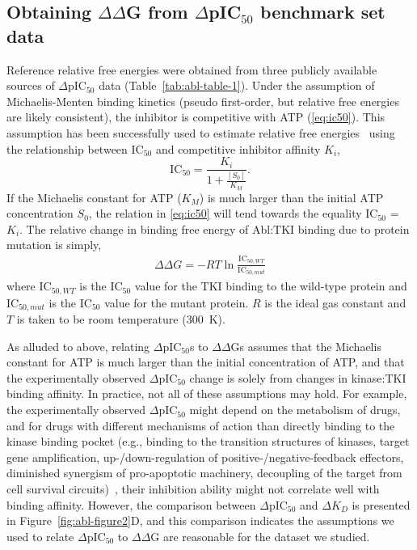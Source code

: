 \documentclass[phd,tocprelim]{cornell}
\renewcommand{\EQ}[1]{\autoref{eq:#1}}
\begin{document}
\subsection{Obtaining $\Delta\Delta$G from $\Delta$pIC$_{50}$ benchmark set data}
Reference relative free energies were obtained from three publicly available sources of $\Delta$pIC$_{50}$ data (Table~\ref{tab:abl-table-1}).
Under the assumption of Michaelis-Menten binding kinetics (pseudo first-order, but relative free energies are likely consistent), the inhibitor is competitive with ATP (\EQ{ic50}). 
This assumption has been successfully used to estimate relative free energies~\citep{Price:Bioorg.Med.Chem.Lett.:2000,Luccarelli:J.Chem.TheoryComput.:2010,Michel:J.Med.Chem.:2006,mondal2016} using the relationship between IC$_{50}$ and competitive inhibitor affinity $K_{i}$,
\begin{equation}
\label{eq:ic50}
\mathrm{IC}_{50} = \frac{ K_{i} }{ 1 + \frac{[S_{0}]}{K_{M}} } .
\end{equation}
If the Michaelis constant for ATP ($K_{M}$) is much larger than the initial ATP concentration $S_{0}$, the relation in \EQ{ic50} will tend towards the equality IC$_{50}$ = $K_{i}$. The relative change in binding free energy of Abl:TKI binding due to protein mutation is simply,
\begin{eqnarray}
\Delta\Delta G = - RT \ln \frac{\mathrm{IC}_{50,WT}}{\mathrm{IC}_{50,mut}} \label{eq:ddg}
\end{eqnarray}
where IC$_{50,WT}$ is the IC$_{50}$ value for the TKI binding to the wild-type protein and IC$_{50,mut}$ is the IC$_{50}$ value for the mutant protein. 
$R$ is the ideal gas constant and $T$ is taken to be room temperature (300~K).

As alluded to above, relating $\Delta$pIC$_{50}$s to $\Delta\Delta$Gs assumes that the Michaelis constant for ATP is much larger than the initial concentration of ATP, and that the experimentally observed $\Delta$pIC$_{50}$ change is solely from changes in kinase:TKI binding affinity. In practice, not all of these assumptions may hold. 
For example, the experimentally observed $\Delta$pIC$_{50}$ might depend on the metabolism of drugs, and for drugs with different mechanisms of action than directly binding to the kinase binding pocket (e.g., binding to the transition structures of kinases, target gene amplification, up-/down-regulation of positive-/negative-feedback effectors, diminished synergism of pro-apoptotic machinery, decoupling of the target from cell survival circuits)~\citep{BarouchBentov:2011dx,McDermott:2007kq},
their inhibition ability might not correlate well with binding affinity. 
However, the comparison between $\Delta$pIC$_{50}$ and $\Delta K_{D}$ is presented in Figure~\ref{fig:abl-figure2}D, and this comparison indicates the assumptions we used to relate $\Delta$pIC$_{50}$ to $\Delta\Delta$G are reasonable for the dataset we studied.
\end{document}
